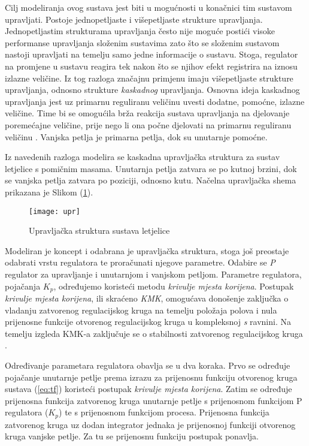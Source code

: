 \documentclass[11pt,a4paper]{article}
\begin{document}
Cilj modeliranja ovog sustava jest biti u mogućnosti u konačnici tim sustavom upravljati. Postoje jednopetljaste i višepetljaste strukture upravljanja. Jednopetljastim strukturama upravljanja često nije moguće postići visoke performanse upravljanja složenim sustavima zato što se složenim sustavom nastoji upravljati na temelju samo jedne informacije o sustavu. Stoga, regulator na promjene u sustavu reagira tek nakon što se njihov efekt registrira na iznosu izlazne veličine. Iz tog razloga značajnu primjenu imaju višepetljaste strukture upravljanja, odnosno strukture \textit{kaskadnog} upravljanja. Osnovna ideja kaskadnog upravljanja jest uz primarnu reguliranu veličinu uvesti dodatne, pomoćne, izlazne veličine. Time bi se omogućila brža reakcija sustava upravljanja na djelovanje poremećajne veličine, prije nego li ona počne djelovati na primarnu reguliranu veličinu \cite{uemp}. Vanjska petlja je primarna petlja, dok su unutarnje pomoćne.   

\medskip

Iz navedenih razloga modelira se kaskadna upravljačka struktura za sustav letjelice s pomičnim masama. Unutarnja petlja zatvara se po kutnoj brzini, dok se vanjska petlja zatvara po poziciji, odnosno kutu. Načelna upravljačka shema prikazana je Slikom (\ref{fig:upr}). 


\begin{figure}[H]
	\centering
	\texttt{[image: upr]}
	\caption{Upravljačka struktura sustava letjelice}
	\label{fig:upr}
\end{figure}

\newpage

Modeliran je koncept i odabrana je upravljačka struktura, stoga još preostaje odabrati vrstu regulatora te proračunati njegove parametre. Odabire se \textit{P} regulator za upravljanje i unutarnjom i vanjskom petljom. Parametre regulatora, pojačanja $K_{p}$, određujemo koristeći metodu \textit{krivulje mjesta korijena}. Postupak \textit{krivulje mjesta korijena}, ili skraćeno \textit{KMK}, omogućava donošenje zaključka o vladanju zatvorenog regulacijskog kruga na temelju položaja polova i nula prijenosne funkcije otvorenog regulacijskog kruga u kompleksnoj \textit{s} ravnini. Na temelju izgleda KMK-a zaključuje se o stabilnosti zatvorenog regulacijskog kruga \cite{mato}. 

\medskip

Određivanje parametara regulatora obavlja se u dva koraka. Prvo se određuje pojačanje unutarnje petlje prema izrazu za prijenosnu funkciju otvorenog kruga sustava (\ref{eq:tf}) koristeći postupak \textit{krivulje mjesta korijena}. Zatim se određuje prijenosna funkcija zatvorenog kruga unutarnje petlje s prijenosnom funkcijom P regulatora ($K_{p}$) te s prijenosnom funkcijom procesa. Prijenosna funkcija zatvorenog kruga uz dodan integrator jednaka je prijenosnoj funkciji otvorenog kruga vanjske petlje. Za tu se prijenosnu funkciju postupak ponavlja.  
\end{document}
